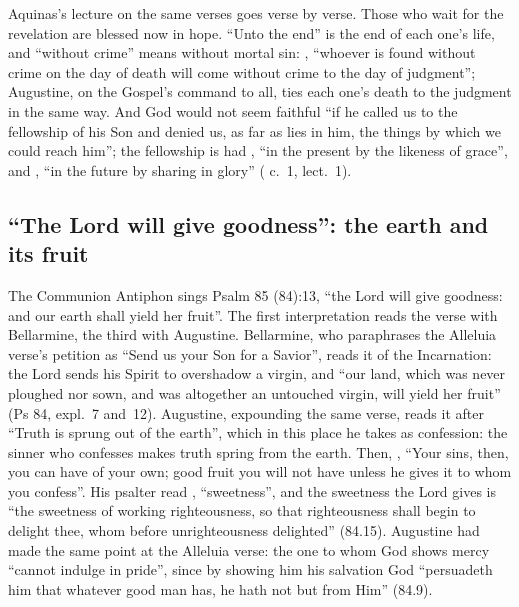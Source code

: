 Aquinas's lecture on the same verses goes verse by verse. Those who wait for
the revelation are blessed now in hope. ``Unto the end'' is the end of each
one's life, and ``without crime'' means without mortal sin: ,
``whoever is found without crime on the day of death will come without crime
to the day of judgment''; Augustine, on the Gospel's command to all, ties each
one's death to the judgment in the same way. And God would not seem faithful ``if he called us to
the fellowship of his Son and denied us, as far as lies in him, the things by
which we could reach him''; the fellowship is had , ``in the present by the likeness of grace'', and
, ``in the future by sharing in
glory'' ( c.~1, lect.~1).

\subsection{``The Lord will give goodness'': the earth and its fruit}

The Communion Antiphon sings Psalm 85 (84):13, ``the Lord will give goodness:
and our earth shall yield her fruit''. The first interpretation reads the
verse with Bellarmine, the third with Augustine. Bellarmine, who paraphrases
the Alleluia verse's petition as ``Send us your Son for a Savior'', reads it
of the Incarnation: the Lord sends his Spirit to overshadow a virgin, and
``our land, which was never ploughed nor sown, and was altogether an untouched
virgin, will yield her fruit'' (Ps 84, expl.~7 and~12). Augustine, expounding
the same verse, reads it after ``Truth is sprung out of the earth'', which in
this place he takes as confession: the sinner who confesses makes truth spring
from the earth. Then, , ``Your sins, then, you can have of your own; good fruit you will
not have unless he gives it to whom you confess''. His psalter read
, ``sweetness'', and the sweetness the Lord gives is ``the
sweetness of working righteousness, so that righteousness shall begin to
delight thee, whom before unrighteousness delighted'' (84.15). Augustine had
made the same point at the Alleluia verse: the one to whom God shows mercy ``cannot indulge in pride'', since by showing him his salvation
God ``persuadeth him that whatever good man has, he hath not but from Him''
(84.9).

